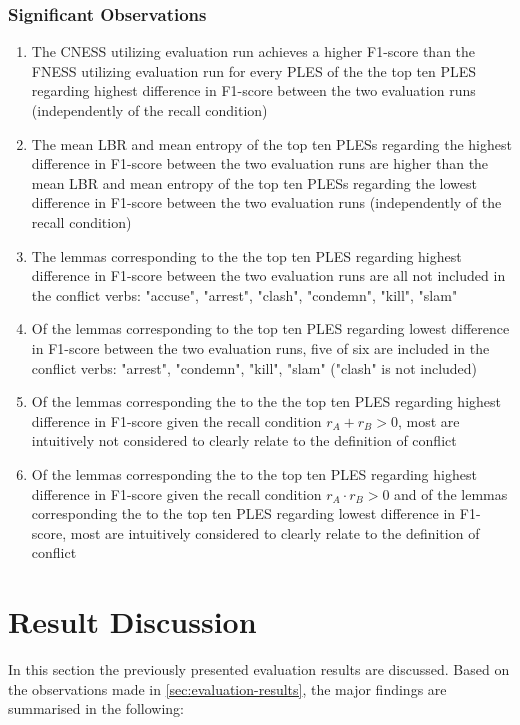 \documentclass[11pt]{scrreprt}
\begin{document}
\subsubsection{Significant Observations}
\begin{enumerate}
	\item The CNESS utilizing evaluation run achieves a higher F1-score than the FNESS utilizing evaluation run for every PLES of the the top ten PLES regarding highest difference in F1-score between the two evaluation runs (independently of the recall condition)
	\item The mean LBR and mean entropy of the top ten PLESs regarding the highest difference in F1-score between the two evaluation runs are higher than the mean LBR and mean entropy of the top ten PLESs regarding the lowest difference in F1-score between the two evaluation runs (independently of the recall condition)
	\item The lemmas corresponding to the the top ten PLES regarding highest difference in F1-score between the two evaluation runs are all not included in the conflict verbs: "accuse", "arrest", "clash", "condemn", "kill", "slam" 
	\item Of the lemmas corresponding to  the top ten PLES regarding lowest difference in F1-score between the two evaluation runs, five of six are included in the conflict verbs: "arrest", "condemn", "kill", "slam" ("clash" is not included) 
	\item Of the lemmas corresponding the to the the top ten PLES regarding highest difference in F1-score given the recall condition \(r_A + r_B > 0\), most are intuitively not considered to clearly relate to the definition of conflict
	\item Of the lemmas corresponding the to  the top ten PLES regarding highest difference in F1-score given the recall condition \(r_A \cdot r_B > 0\) and of the lemmas corresponding the to the top ten PLES regarding lowest difference in F1-score, most are intuitively considered to clearly relate to the definition of conflict

\end{enumerate}


\section{Result Discussion}
\label{sec:result-discussion}
In this section the previously presented evaluation results are discussed. Based on the observations made in \cref{sec:evaluation-results}, the major findings are summarised in the following:
\end{document}
